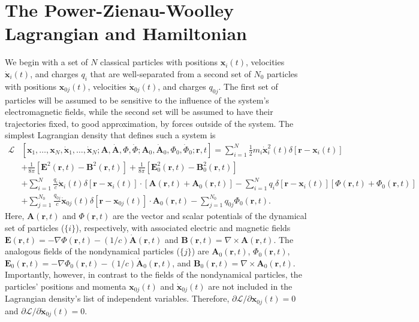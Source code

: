 
\section{The Power-Zienau-Woolley Lagrangian and Hamiltonian}\label{sec:PZWderivation}

We begin with a set of $N$ classical particles with positions $\mathbf{x}_i(t)$, velocities $\dot{\mathbf{x}}_i(t)$, and charges $q_i$ that are well-separated from a second set of $N_0$ particles with positions $\mathbf{x}_{0j}(t)$, velocities $\dot{\mathbf{x}}_{0j}(t)$, and charges $q_{0j}$. The first set of particles will be assumed to be sensitive to the influence of the system's electromagnetic fields, while the second set will be assumed to have their trajectories fixed, to good approximation, by forces outside of the system. The simplest Lagrangian density that defines such a system is
\begin{equation}
\begin{split}
\mathcal{L}&\left[\mathbf{x}_1,\ldots,\mathbf{x}_N,\dot{\mathbf{x}}_1,\ldots,\dot{\mathbf{x}}_N;\mathbf{A},\dot{\mathbf{A}},\Phi,\dot{\Phi};\mathbf{A}_0,\dot{\mathbf{A}}_0,\Phi_0,\dot{\Phi}_0;\mathbf{r},t\right] = \sum_{i = 1}^N\frac{1}{2}m_i\dot{\mathbf{x}}_i^2(t)\delta[\mathbf{r} - \mathbf{x}_i(t)]\\
& + \frac{1}{8\pi}\left[\mathbf{E}^2(\mathbf{r},t) - \mathbf{B}^2(\mathbf{r},t)\right] + \frac{1}{8\pi}\left[\mathbf{E}_0^2(\mathbf{r},t) - \mathbf{B}_0^2(\mathbf{r},t)\right]\\
&+ \sum_{i = 1}^N\frac{q_i}{c}\dot{\mathbf{x}}_i(t)\delta[\mathbf{r} - \mathbf{x}_i(t)]\cdot\left[\mathbf{A}(\mathbf{r},t) + \mathbf{A}_0(\mathbf{r},t)\right] - \sum_{i = 1}^Nq_i\delta[\mathbf{r} - \mathbf{x}_i(t)]\left[\Phi(\mathbf{r},t) + \Phi_0(\mathbf{r},t)\right]\\
&+\sum_{j = 1}^{N_0}\frac{q_{0j}}{c}\dot{\mathbf{x}}_{0j}(t)\delta[\mathbf{r} - \mathbf{x}_{0j}(t)]\cdot\mathbf{A}_0(\mathbf{r},t) - \sum_{j = 1}^{N_0}q_{0j}\Phi_0(\mathbf{r},t).
\end{split}
\end{equation}
Here, $\mathbf{A}(\mathbf{r},t)$ and $\Phi(\mathbf{r},t)$ are the vector and scalar potentials of the dynamical set of particles ($\{i\}$), respectively, with associated electric and magnetic fields $\mathbf{E}(\mathbf{r},t) = -\nabla\Phi(\mathbf{r},t) - (1/c)\dot{\mathbf{A}}(\mathbf{r},t)$ and $\mathbf{B}(\mathbf{r},t) = \nabla\times\mathbf{A}(\mathbf{r},t)$. The analogous fields of the nondynamical particles ($\{j\}$) are $\mathbf{A}_0(\mathbf{r},t)$, $\Phi_0(\mathbf{r},t)$, $\mathbf{E}_0(\mathbf{r},t) = -\nabla\Phi_0(\mathbf{r},t) - (1/c)\dot{\mathbf{A}}_0(\mathbf{r},t)$, and $\mathbf{B}_0(\mathbf{r},t) = \nabla\times\mathbf{A}_0(\mathbf{r},t)$. Importantly, however, in contrast to the fields of the nondynamical particles, the particles' positions and momenta $\mathbf{x}_{0j}(t)$ and $\dot{\mathbf{x}}_{0j}(t)$ are not included in the Lagrangian density's list of independent variables. Therefore, $\partial\mathcal{L}/\partial\mathbf{x}_{0j}(t) = 0$ and $\partial\mathcal{L}/\partial\dot{\mathbf{x}}_{0j}(t) = 0$.

